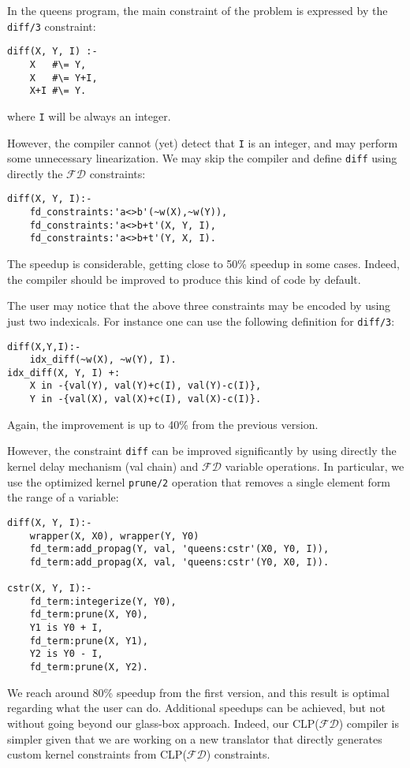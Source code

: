 \documentclass{llncs}
\newcommand{\clpfd}{CLP($\mathcal{FD}$)\xspace}
\newcommand{\fd}{$\mathcal{FD}$\xspace}
\begin{document}
In the queens program, the main constraint of the problem is expressed
by the \verb|diff/3| constraint:
\begin{lstlisting}
diff(X, Y, I) :-
    X   #\= Y,
    X   #\= Y+I,
    X+I #\= Y.
\end{lstlisting}
where \verb!I! will be always an integer.

However, the compiler cannot (yet) detect that \verb!I! is an integer,
and may perform some unnecessary linearization. We may skip the
compiler and define \verb!diff! using directly the \fd constraints:
\begin{lstlisting}
diff(X, Y, I):-
    fd_constraints:'a<>b'(~w(X),~w(Y)),
    fd_constraints:'a<>b+t'(X, Y, I),
    fd_constraints:'a<>b+t'(Y, X, I).
\end{lstlisting}
The speedup is considerable, getting close to 50\% speedup in some
cases. Indeed, the compiler should be improved to produce this kind of
code by default.

The user may notice that the above three constraints may be encoded by
using just two indexicals. For instance one can use the following
definition for \verb|diff/3|:
\begin{lstlisting}
diff(X,Y,I):-
    idx_diff(~w(X), ~w(Y), I).
idx_diff(X, Y, I) +:
    X in -{val(Y), val(Y)+c(I), val(Y)-c(I)},
    Y in -{val(X), val(X)+c(I), val(X)-c(I)}.
\end{lstlisting}
Again, the improvement is up to 40\% from the previous version.

However, the constraint \verb!diff! can be improved significantly by using
directly the kernel delay mechanism (val chain) and \fd variable
operations. In particular, we use the optimized kernel \verb|prune/2|
operation that removes a single element form the range of a
variable:
\begin{lstlisting}
diff(X, Y, I):-
	wrapper(X, X0), wrapper(Y, Y0)
  	fd_term:add_propag(Y, val, 'queens:cstr'(X0, Y0, I)),
  	fd_term:add_propag(X, val, 'queens:cstr'(Y0, X0, I)).

cstr(X, Y, I):-
  	fd_term:integerize(Y, Y0),
  	fd_term:prune(X, Y0),
  	Y1 is Y0 + I,
  	fd_term:prune(X, Y1),
  	Y2 is Y0 - I,
  	fd_term:prune(X, Y2).
\end{lstlisting}
We reach around 80\% speedup from the first version, and this result
is optimal regarding what the user can do. Additional speedups can be
achieved, but not without going beyond our glass-box approach.
Indeed, our \clpfd compiler is simpler given that we are working on a
new translator that directly generates custom kernel constraints from
\clpfd constraints.
\end{document}
